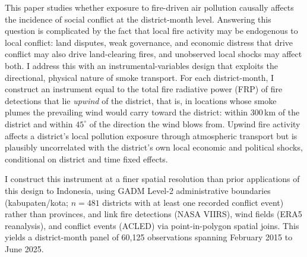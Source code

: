 \documentclass[12pt]{article}
\begin{document}
This paper studies whether exposure to fire-driven air pollution causally affects the incidence of social conflict at the district-month level. Answering this question is complicated by the fact that local fire activity may be endogenous to local conflict: land disputes, weak governance, and economic distress that drive conflict may also drive land-clearing fires, and unobserved local shocks may affect both. I address this with an instrumental-variables design that exploits the directional, physical nature of smoke transport. For each district-month, I construct an instrument equal to the total fire radiative power (FRP) of fire detections that lie \emph{upwind} of the district, that is, in locations whose smoke plumes the prevailing wind would carry toward the district: within 300\,km of the district and within $45^{\circ}$ of the direction the wind blows from. Upwind fire activity affects a district's local pollution exposure through atmospheric transport but is plausibly uncorrelated with the district's own local economic and political shocks, conditional on district and time fixed effects.

I construct this instrument at a finer spatial resolution than prior applications of this design to Indonesia, using GADM Level-2 administrative boundaries (kabupaten/kota; $n=481$ districts with at least one recorded conflict event) rather than provinces, and link fire detections (NASA VIIRS), wind fields (ERA5 reanalysis), and conflict events (ACLED) via point-in-polygon spatial joins. This yields a district-month panel of 60,125 observations spanning February 2015 to June 2025.
\end{document}
